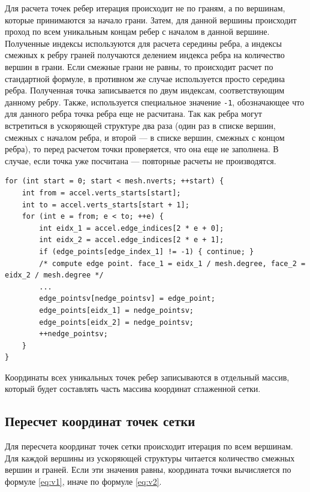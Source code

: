 \documentclass[14pt]{extarticle}
\begin{document}
Для расчета точек ребер итерация происходит не по граням, а по вершинам, которые принимаются за начало грани. Затем, для данной вершины происходит проход по всем уникальным концам ребер с началом в данной вершине. Полученные индексы используются для расчета середины ребра, а индексы смежных к ребру граней получаются делением индекса ребра на количество вершин в грани. Если смежные грани не равны, то происходит расчет по стандартной формуле,
в противном же случае используется просто середина ребра. Полученная точка записывается по двум индексам, соответствующим данному ребру. Также, используется специальное значение \texttt{-1}, обозначающее что для данного ребра точка ребра еще не расчитана. Так как ребра могут встретиться в ускоряющей структуре два раза (один раз в списке вершин, смежных с началом ребра, и второй --- в списке вершин, смежных с концом ребра), то перед расчетом точки проверяется, что она еще не заполнена. В случае, если точка уже посчитана --- повторные расчеты не производятся.
\begin{lstlisting}[caption={Расчет и сохранение точек ребер}, captionpos=b]
for (int start = 0; start < mesh.nverts; ++start) {
    int from = accel.verts_starts[start];
    int to = accel.verts_starts[start + 1];        
    for (int e = from; e < to; ++e) {
        int eidx_1 = accel.edge_indices[2 * e + 0];
        int eidx_2 = accel.edge_indices[2 * e + 1];        
        if (edge_points[edge_index_1] != -1) { continue; }         
        /* compute edge point. face_1 = eidx_1 / mesh.degree, face_2 = eidx_2 / mesh.degree */
        ...
        edge_pointsv[nedge_pointsv] = edge_point;            
        edge_points[eidx_1] = nedge_pointsv;
        edge_points[eidx_2] = nedge_pointsv; 
        ++nedge_pointsv;
    }
}
\end{lstlisting}

Координаты всех уникальных точек ребер записываются в отдельный массив, который будет составлять часть массива координат сглаженной сетки.

\subsection{Пересчет координат точек сетки}
Для пересчета координат точек сетки происходит итерация по всем вершинам. Для каждой вершины из ускоряющей структуры читается количество смежных вершин и граней. Если эти значения равны, координата точки вычисляется по формуле \eqref{eq:v1}, иначе по формуле \eqref{eq:v2}.
\end{document}
